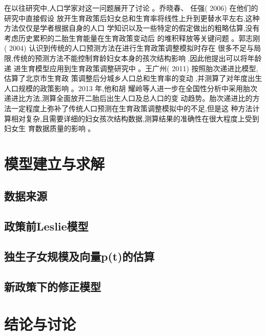 \documentclass[a4paper]{article}
\begin{document}
在以往研究中,人口学家对这一问题展开了讨论 。乔晓春、 任强( 2006) 在他们的研究中直接假设
放开生育政策后妇女总和生育率将线性上升到更替水平左右,这种方法仅仅是学者根据自身的人口
学知识以及一些特定的假定做出的粗略估算,没有考虑历史累积的二胎生育能量在生育政策变动后
的堆积释放等关键问题 。郭志刚( 2004) 认识到传统的人口预测方法在进行生育政策调整模拟时存在
很多不足与局限,传统的预测方法不能控制育龄妇女本身的孩次结构影响 ,因此他提出可以将年龄递
进生育模型应用到生育政策调整研究中 。王广州( 2011) 按照胎次递进比模型,估算了北京市生育政
策调整后分城乡人口总和生育率的变动 ,并测算了对年度出生人口规模的政策影响 。2013 年,他和胡
耀岭等人进一步在全国性分析中采用胎次递进比方法,测算全面放开二胎后出生人口及总人口的变
动趋势。胎次递进比的方法一定程度上弥补了传统人口预测在生育政策调整模拟中的不足,但是这
种方法计算相对复杂,且需要详细的妇女孩次结构数据,测算结果的准确性在很大程度上受到妇女生
育数据质量的影响 。
\cite{zhenwu14}\par
\section{模型建立与求解}
\subsection{数据来源}
\subsection{政策前Leslie模型}
\subsection{独生子女规模及向量\textbf{p(t)}的估算}
\subsection{新政策下的修正模型}
\section{结论与讨论}
\medskip
\printbibliography %
\end{document}
